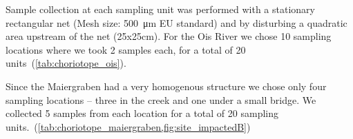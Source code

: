 Sample collection at each sampling unit was performed with a stationary rectangular net (Mesh size: \SI{500}{\micro\meter} EU standard) and by disturbing a quadratic area upstream of the net (25x25cm). For the Ois River we chose 10 sampling locations where we took 2 samples each, for a total of 20 units~(\cref{tab:choriotope_ois}).




Since the Maiergraben had a very homogenous structure we chose only four sampling locations – three in the creek and one under a small bridge. We collected 5 samples from each location for a total of 20 sampling units.~(\cref{tab:choriotope_maiergraben,fig:site_impactedB})


\begin{table}[!htb]
  \small                                                       %
  \caption{Choriotope description of the sampling units at the Maiergraben.}
  \label{tab:choriotope_maiergraben}%
\end{table}%


